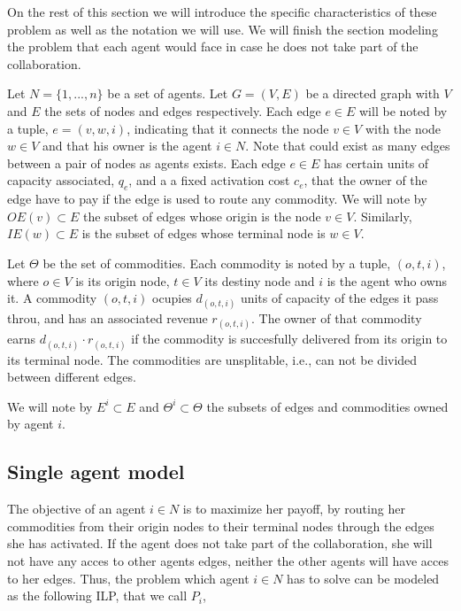 \documentclass[review]{elsarticle}
\begin{document}
On the rest of this section we will introduce the specific characteristics of
these problem as well as the notation we will use. We will finish the section
modeling the problem that each agent would face in case he does not take part of
the collaboration.

Let $N=\{1,...,n\}$ be a set of agents. Let $G=(V,E)$ be a directed graph with
$V$ and $E$ the sets of nodes and edges respectively. Each edge $e \in E$ will
be noted by a tuple, $e=(v,w,i)$, indicating that it connects the node $v\in V$
with the node $w \in V$ and that his owner is the agent $i\in N$. Note that
could exist as many edges between a pair of nodes as agents exists. Each edge $e
\in E$ has certain units of capacity associated, $q_e$, and a a fixed activation
cost $c_e$, that the owner of the edge have to pay if the edge is used to route
any commodity. We will note by $OE(v)\subset E$ the subset of edges whose origin
is the node $v\in V$. Similarly, $IE(w)\subset E$ is the subset of edges whose
terminal node is $w\in V$.

Let $\Theta$ be the set of commodities. Each commodity is noted by a tuple,
$(o,t,i)$, where $o\in V$ is its origin node, $t\in V$ its destiny node and $i$
is the agent who owns it. A commodity $(o,t,i)$ ocupies $d_{(o,t,i)}$ units of
capacity of the edges it pass throu, and has an associated revenue
$r_{(o,t,i)}$. The owner of that commodity earns $d_(o,t,i)\cdot r_(o,t,i)$ if
the commodity is succesfully delivered from its origin to its terminal node. The
commodities are unsplitable, i.e., can not be divided between different edges.

We will note by $E^i \subset E$ and $\Theta^i\subset \Theta$ the subsets of
edges and commodities owned by agent $i$.

\subsection{Single agent model}

The objective of an agent $i \in N$ is to maximize her payoff, by routing her
commodities from their origin nodes to their terminal nodes through the edges
she has activated. If the agent does not take part of the collaboration, she
will not have any acces to other agents edges, neither the other agents will
have acces to her edges. Thus, the problem which agent $i\in N$ has to solve can
be modeled as the following ILP, that we call $P_i$, 
\end{document}

